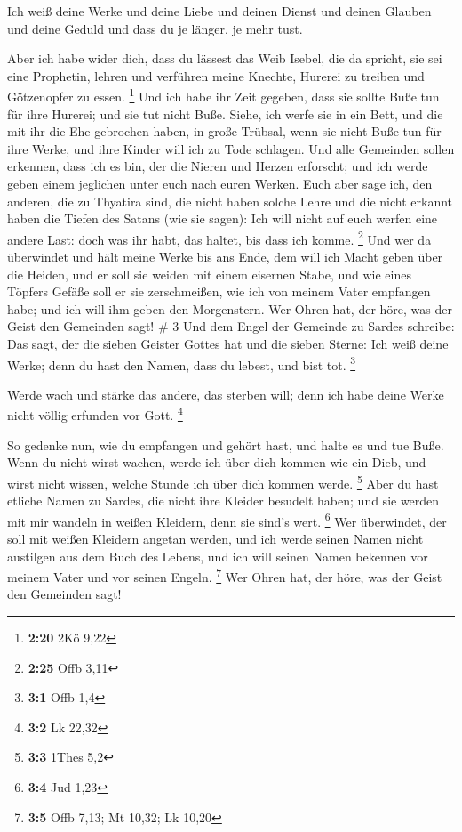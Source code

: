  Ich weiß deine Werke und deine Liebe und deinen Dienst
und deinen Glauben und deine Geduld und dass du je länger, je mehr tust.

 Aber ich habe wider dich, dass du lässest das Weib
Isebel, die da spricht, sie sei eine Prophetin, lehren und verführen
meine Knechte, Hurerei zu treiben und Götzenopfer zu essen. \footnote{\textbf{2:20}
  2Kö 9,22}  Und ich habe ihr Zeit gegeben, dass sie
sollte Buße tun für ihre Hurerei; und sie tut nicht Buße.
 Siehe, ich werfe sie in ein Bett, und die mit ihr die
Ehe gebrochen haben, in große Trübsal, wenn sie nicht Buße tun für ihre
Werke,  und ihre Kinder will ich zu Tode schlagen. Und
alle Gemeinden sollen erkennen, dass ich es bin, der die Nieren und
Herzen erforscht; und ich werde geben einem jeglichen unter euch nach
euren Werken.  Euch aber sage ich, den anderen, die zu
Thyatira sind, die nicht haben solche Lehre und die nicht erkannt haben
die Tiefen des Satans (wie sie sagen): Ich will nicht auf euch werfen
eine andere Last:  doch was ihr habt, das haltet, bis
dass ich komme. \footnote{\textbf{2:25} Offb 3,11}  Und
wer da überwindet und hält meine Werke bis ans Ende, dem will ich Macht
geben über die Heiden,  und er soll sie weiden mit einem
eisernen Stabe, und wie eines Töpfers Gefäße soll er sie zerschmeißen,
 wie ich von meinem Vater empfangen habe; und ich will
ihm geben den Morgenstern.  Wer Ohren hat, der höre, was
der Geist den Gemeinden sagt! \# 3  Und dem Engel der
Gemeinde zu Sardes schreibe: Das sagt, der die sieben Geister Gottes hat
und die sieben Sterne: Ich weiß deine Werke; denn du hast den Namen,
dass du lebest, und bist tot. \footnote{\textbf{3:1} Offb 1,4}

 Werde wach und stärke das andere, das sterben will; denn
ich habe deine Werke nicht völlig erfunden vor Gott. \footnote{\textbf{3:2}
  Lk 22,32}

 So gedenke nun, wie du empfangen und gehört hast, und
halte es und tue Buße. Wenn du nicht wirst wachen, werde ich über dich
kommen wie ein Dieb, und wirst nicht wissen, welche Stunde ich über dich
kommen werde. \footnote{\textbf{3:3} 1Thes 5,2}  Aber du
hast etliche Namen zu Sardes, die nicht ihre Kleider besudelt haben; und
sie werden mit mir wandeln in weißen Kleidern, denn sie sind's wert.
\footnote{\textbf{3:4} Jud 1,23}  Wer überwindet, der soll
mit weißen Kleidern angetan werden, und ich werde seinen Namen nicht
austilgen aus dem Buch des Lebens, und ich will seinen Namen bekennen
vor meinem Vater und vor seinen Engeln. \footnote{\textbf{3:5} Offb
  7,13; Mt 10,32; Lk 10,20}  Wer Ohren hat, der höre, was
der Geist den Gemeinden sagt!


